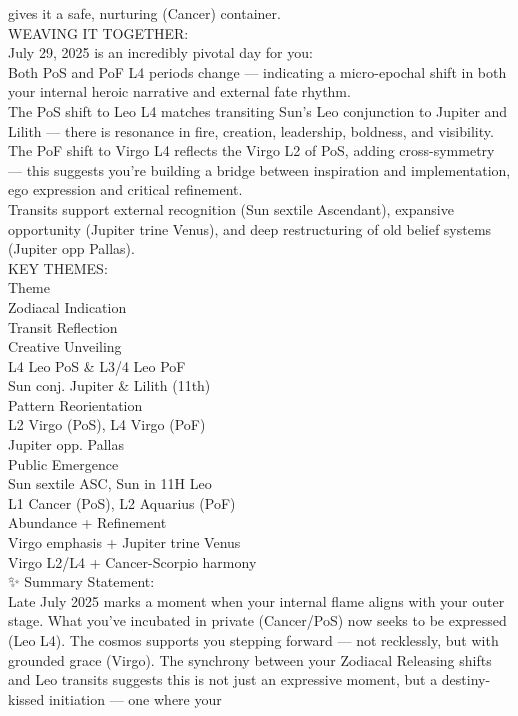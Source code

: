 \documentclass{article}
\begin{document}
gives it a safe, nurturing (Cancer) container.\\
 WEAVING IT TOGETHER:\\
July 29, 2025 is an incredibly pivotal day for you:\\
Both PoS and PoF L4 periods change --- indicating a micro-epochal shift
in both your internal heroic narrative and external fate rhythm.\\
The PoS shift to Leo L4 matches transiting Sun's Leo conjunction to
Jupiter and Lilith --- there is resonance in fire, creation, leadership,
boldness, and visibility.\\
The PoF shift to Virgo L4 reflects the Virgo L2 of PoS, adding
cross-symmetry --- this suggests you're building a bridge between
inspiration and implementation, ego expression and critical
refinement.\\
Transits support external recognition (Sun sextile Ascendant), expansive
opportunity (Jupiter trine Venus), and deep restructuring of old belief
systems (Jupiter opp Pallas).\\
 KEY THEMES:\\
Theme\\
Zodiacal Indication\\
Transit Reflection\\
Creative Unveiling\\
L4 Leo PoS \& L3/4 Leo PoF\\
Sun conj. Jupiter \& Lilith (11th)\\
Pattern Reorientation\\
L2 Virgo (PoS), L4 Virgo (PoF)\\
Jupiter opp. Pallas\\
Public Emergence\\
Sun sextile ASC, Sun in 11H Leo\\
L1 Cancer (PoS), L2 Aquarius (PoF)\\
Abundance + Refinement\\
Virgo emphasis + Jupiter trine Venus\\
Virgo L2/L4 + Cancer-Scorpio harmony\\
✨ Summary Statement:\\
Late July 2025 marks a moment when your internal flame aligns with your
outer stage. What you've incubated in private (Cancer/PoS) now seeks to
be expressed (Leo L4). The cosmos supports you stepping forward --- not
recklessly, but with grounded grace (Virgo). The synchrony between your
Zodiacal Releasing shifts and Leo transits suggests this is not just an
expressive moment, but a destiny-kissed initiation --- one where your
\end{document}
